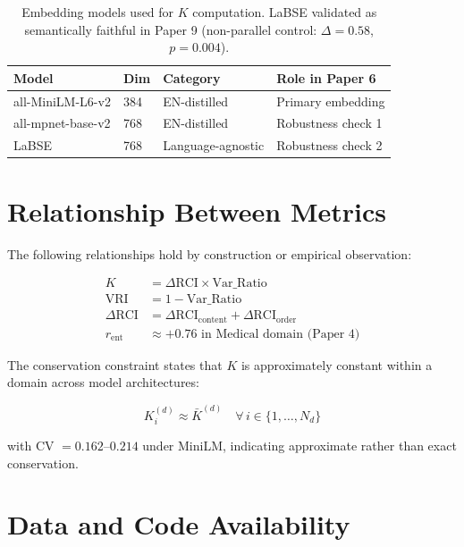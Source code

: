 \documentclass[11pt,a4paper]{article}
\begin{document}
\begin{table}[H]
\centering
\begin{tabular}{llll}
\toprule
\textbf{Model} & \textbf{Dim} & \textbf{Category} & \textbf{Role in Paper 6} \\
\midrule
all-MiniLM-L6-v2  & 384 & EN-distilled  & Primary embedding \\
all-mpnet-base-v2 & 768 & EN-distilled  & Robustness check 1 \\
LaBSE             & 768 & Language-agnostic & Robustness check 2 \\
\bottomrule
\end{tabular}
\caption{Embedding models used for $K$ computation. LaBSE validated as semantically
faithful in Paper 9 (non-parallel control: $\Delta = 0.58$, $p = 0.004$).}
\end{table}

\section{Relationship Between Metrics}

The following relationships hold by construction or empirical observation:

\begin{align}
    K &= \Delta\text{RCI} \times \text{Var\_Ratio} \\
    \text{VRI} &= 1 - \text{Var\_Ratio} \\
    \Delta\text{RCI} &= \Delta\text{RCI}_{\text{content}} +
    \Delta\text{RCI}_{\text{order}} \\
    r_{\text{ent}} &\approx +0.76 \text{ in Medical domain (Paper 4)}
\end{align}

The conservation constraint states that $K$ is approximately constant within a
domain across model architectures:

\begin{equation}
    K_i^{(d)} \approx \bar{K}^{(d)} \quad \forall\, i \in \{1, \ldots, N_d\}
\end{equation}

with CV $= 0.162$--$0.214$ under MiniLM, indicating approximate rather than exact
conservation.

\section{Data and Code Availability}
\end{document}

